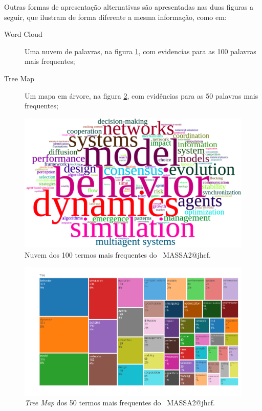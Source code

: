 Outras formas de apresentação alternativas são apresentadas nas duas figuras a seguir, que ilustram de forma diferente a mesma informação, como em:
\begin{description}
    \item [Word Cloud] Uma nuvem de palavras, na figura \ref{fig:MASSA2-WordCloud-100words}, com evidencias para as 100 palavras mais frequentes;
    \item [Tree Map] Um mapa em árvore, na figura \ref{fig:MASSA2-TreeMap}, com evidências para as 50 palavras mais frequentes;
\end{description}

\begin{figure}
    \centering
    \includegraphics[width=1\textwidth]{exploratory-data-analysis/jhcf/PesqBibliogr/SimulacaoMultiagente/WoS-20220203/Metricas/Documentos/MASSA2-WordCloud-100words.png}
    \caption{Nuvem dos 100 termos mais frequentes do \dataset\ MASSA2@jhcf.}
    \label{fig:MASSA2-WordCloud-100words}
\end{figure}

\begin{figure}
    \centering
    \includegraphics[width=1\textwidth]{exploratory-data-analysis/jhcf/PesqBibliogr/SimulacaoMultiagente/WoS-20220203/Metricas/Documentos/MASSA2-TreeMap.png}
    \caption{\textit{Tree Map} dos 50 termos mais frequentes do \dataset\ MASSA2@jhcf.}
    \label{fig:MASSA2-TreeMap}
\end{figure}

